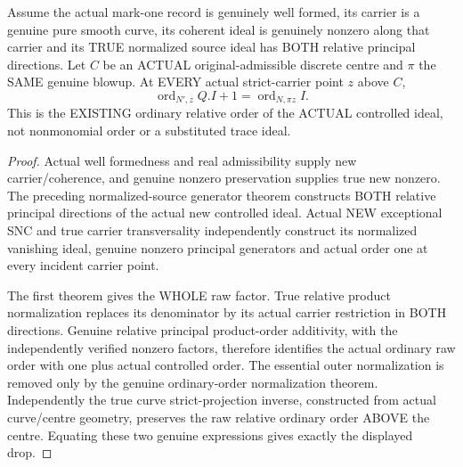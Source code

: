 \begin{theorem}
\label{hir:sharp-actual-curve-controlled-ordinary-order-drop}
\leanok
Assume the actual mark-one record is genuinely well formed, its carrier
is a genuine pure smooth curve, its coherent ideal is genuinely nonzero
along that carrier and its TRUE normalized source ideal has BOTH relative
principal directions. Let $C$ be an ACTUAL original-admissible discrete
centre and $\pi$ the SAME genuine blowup. At EVERY actual strict-carrier
point $z$ above $C$,
\[
 \operatorname{ord}_{N',z} Q.I+1=\operatorname{ord}_{N,\pi z}I.
\]
This is the EXISTING ordinary relative order of the ACTUAL controlled
ideal, not nonmonomial order or a substituted trace ideal.
\end{theorem}
\begin{proof}
Actual well formedness and real admissibility supply new carrier/coherence,
and genuine nonzero preservation supplies true new nonzero. The preceding
normalized-source generator theorem constructs BOTH relative principal
directions of the actual new controlled ideal. Actual NEW exceptional
SNC and true carrier transversality independently construct its normalized
vanishing ideal, genuine nonzero principal generators and actual order
one at every incident carrier point.

The first theorem gives the WHOLE raw factor. True relative product
normalization replaces its denominator by its actual carrier restriction
in BOTH directions. Genuine relative principal product-order additivity,
with the independently verified nonzero factors, therefore identifies the
actual ordinary raw order with one plus actual controlled order. The
essential outer normalization is removed only by the genuine ordinary-order
normalization theorem. Independently the true curve strict-projection
inverse, constructed from actual curve/centre geometry, preserves the raw
relative ordinary order ABOVE the centre. Equating these two genuine
expressions gives exactly the displayed drop.
\end{proof}

